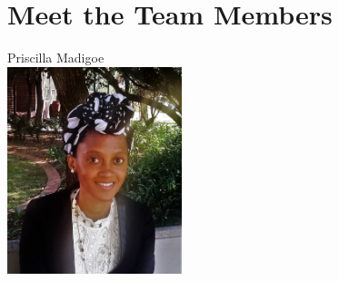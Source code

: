 \documentclass[a4paper,12pt]{article}
\begin{document}
\newpage
\section{Meet the Team Members}


\begin{center}
{\Large Priscilla {Madigoe}} \\[0.3cm]
\includegraphics[width= 2in]{P.jpg}\\[0.4cm] 
\end{center}
\end{document}
